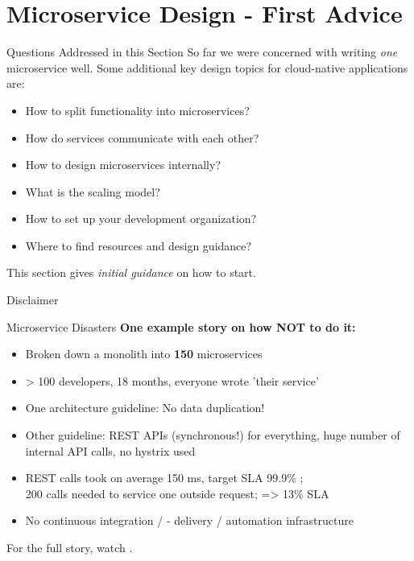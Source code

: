 \part{Microservice Design - First Advice}


\begin{frame}{Questions Addressed in this Section}
So far we were concerned with writing \textit{one} microservice well. 
\vfill
Some additional key design topics for cloud-native applications are:  
\begin{itemize}
	\item How to split functionality into microservices?
    \item How do services communicate with each other?
    \item How to design microservices internally?
    \item What is the scaling model?
	\item How to set up your development organization?
    \item Where to find resources and design guidance?
\end{itemize}
\vfill
This section gives \textit{initial guidance} on how to start.
\end{frame}


\begin{frame}{Disclaimer}
\end{frame}


\begin{frame}[t]{Microservice Disasters}
\textbf{One example story on how NOT to do it:}
\begin{itemize}
    \item Broken down a monolith into \textbf{150} microservices
    \item > 100 developers, 18 months, everyone wrote 'their service'
    \item One architecture guideline: No data duplication!
    \item Other guideline: REST APIs (synchronous!) for everything, huge number of internal API calls, no hystrix used
    \item REST calls took on average 150 ms, target SLA 99.9\% ; \\
          200 calls needed to service one outside request; => 13\% SLA
    \item No continuous integration / - delivery / automation infrastructure
\end{itemize}
\vfill
For the full story, watch .
\end{frame}


